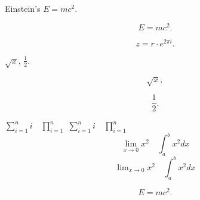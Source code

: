 \documentclass[UTF8]{ctexart}
\begin{document}
Einstein's $E=mc^2$.

\[ E=mc^2. \]

\[ z = r\cdot e^{2\pi i}. \]

$\sqrt{x}$, $\frac{1}{2}$.

\[ \sqrt{x}, \]

\[ \frac{1}{2}. \]

$ \sum_{i=1}^n i\quad \prod_{i=1}^n $
$ \sum\limits _{i=1}^n i\quad \prod\limits _{i=1}^n $
\[ \lim_{x\to0}x^2 \quad \int_a^b x^2 dx \]
\[ \lim\nolimits _{x\to0}x^2\quad \int\nolimits_a^b x^2 dx \]

\begin{equation}
E=mc^2.
\end{equation}
\end{document}
